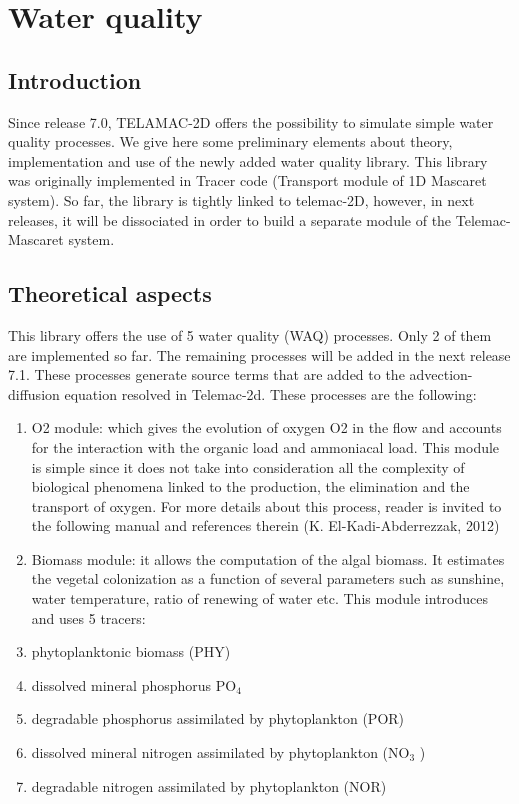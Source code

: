 


\chapter{ Water quality}


\section{  Introduction}



 Since release 7.0, TELAMAC-2D offers the possibility to simulate simple water quality processes. We give here some preliminary elements about theory, implementation and use of the newly added water quality library. This library was originally implemented in Tracer code (Transport module of 1D Mascaret system).  So far, the library is tightly linked to telemac-2D, however, in next releases, it will be dissociated in order to build a separate module of the Telemac-Mascaret system.


\section{ Theoretical aspects}

 This library offers the use of 5 water quality (WAQ) processes. Only 2 of them are implemented so far. The remaining processes will be added in the next release 7.1. These processes generate source terms that are added to the advection-diffusion equation resolved in Telemac-2d. These processes are the following:

\begin{enumerate}
\item  O2 module:  which gives the evolution of oxygen O2 in the flow and accounts for the interaction with the organic load and ammoniacal load. This module is simple since it does not take into consideration all the complexity of biological phenomena linked to the production, the elimination and the transport of oxygen. For more details about this process, reader is invited to the following manual and references therein (K. El-Kadi-Abderrezzak, 2012)

\item  Biomass module:  it allows the computation of the algal biomass. It estimates the vegetal colonization as a function of several parameters such as sunshine, water temperature, ratio of renewing of water etc. This module introduces and uses 5 tracers:

\item  phytoplanktonic biomass (PHY)

\item  dissolved mineral phosphorus PO${}_{4}$

\item  degradable phosphorus assimilated by phytoplankton (POR)

\item  dissolved mineral nitrogen assimilated by phytoplankton (NO${}_{3}$ )

\item  degradable nitrogen assimilated by phytoplankton (NOR)
\end{enumerate}



